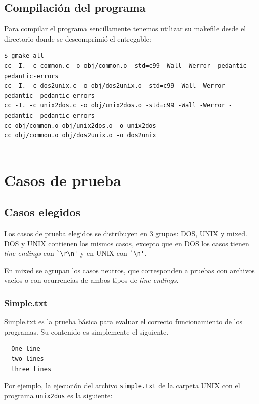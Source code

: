 \documentclass[a4paper,10pt, spanish]{article}
\begin{document}
\lstset{
  language=bash,
  basicstyle=\small\ttfamily
}

\subsection{Compilación del programa}
Para compilar el programa sencillamente tenemos utilizar su makefile desde el directorio donde se descomprimió el entregable:
\begin{lstlisting}
$ gmake all
cc -I. -c common.c -o obj/common.o -std=c99 -Wall -Werror -pedantic -pedantic-errors
cc -I. -c dos2unix.c -o obj/dos2unix.o -std=c99 -Wall -Werror -pedantic -pedantic-errors
cc -I. -c unix2dos.c -o obj/unix2dos.o -std=c99 -Wall -Werror -pedantic -pedantic-errors
cc obj/common.o obj/unix2dos.o -o unix2dos
cc obj/common.o obj/dos2unix.o -o dos2unix
	
\end{lstlisting}

\section{Casos de prueba}

\subsection{Casos elegidos}

Los casos de prueba elegidos se distribuyen en 3 grupos: DOS, UNIX y mixed. \\
DOS y UNIX contienen los mismos casos, excepto que en DOS los casos tienen \textit{line endings}
con \lstinline{`\r\n'} y en UNIX con \lstinline{`\n'}.

En mixed se agrupan los casos neutros, que corresponden a pruebas con archivos vacíos o con ocurrencias
de ambos tipos de \textit{line endings}.

\subsubsection{Simple.txt}

Simple.txt es la prueba básica para evaluar el correcto funcionamiento de los programas.
Su contenido es simplemente el siguiente.

\begin{lstlisting}
  One line
  two lines
  three lines
\end{lstlisting}

Por ejemplo, la ejecución del archivo \lstinline{simple.txt} de la carpeta UNIX con el programa
\lstinline{unix2dos} es la siguiente:
\end{document}
